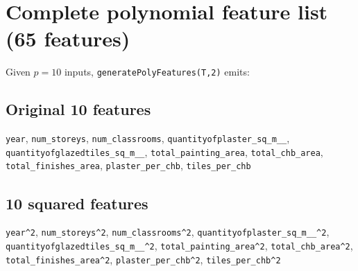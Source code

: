 \documentclass[11pt]{article}
\begin{document}
\section*{Complete polynomial feature list (65 features)}
Given $p=10$ inputs, \verb|generatePolyFeatures(T,2)| emits:
\subsection*{Original 10 features}
\noindent\small
\verb|year|, \verb|num_storeys|, \verb|num_classrooms|, \verb|quantityofplaster_sq_m__|, \verb|quantityofglazedtiles_sq_m__|, \verb|total_painting_area|, \verb|total_chb_area|, \verb|total_finishes_area|, \verb|plaster_per_chb|, \verb|tiles_per_chb|

\normalsize
\subsection*{10 squared features}
\noindent\small
\verb|year^2|, \verb|num_storeys^2|, \verb|num_classrooms^2|, \verb|quantityofplaster_sq_m__^2|, \verb|quantityofglazedtiles_sq_m__^2|, \verb|total_painting_area^2|, \verb|total_chb_area^2|, \verb|total_finishes_area^2|, \verb|plaster_per_chb^2|, \verb|tiles_per_chb^2|

\normalsize
\end{document}
